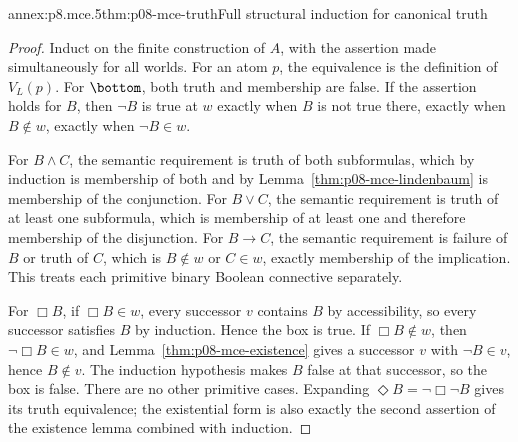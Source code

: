 \begin{annexitem}{annex:p8.mce.5}{thm:p08-mce-truth}{Full structural induction for canonical truth}
\begin{proof}
Induct on the finite construction of \(A\), with the assertion made
simultaneously for all worlds. For an atom \(p\), the equivalence is
the definition of \(V_L(p)\). For \(\bottom\), both truth and
membership are false. If the assertion holds for \(B\), then
\(\neg B\) is true at \(w\) exactly when \(B\) is not true
there, exactly when \(B\notin w\), exactly when \(\neg B\in w\).

For \(B\land C\), the semantic requirement is truth of both
subformulas, which by induction is membership of both and by
Lemma~\ref{thm:p08-mce-lindenbaum} is membership of the conjunction.
For \(B\lor C\), the semantic requirement is truth of at least one
subformula, which is membership of at least one and therefore membership
of the disjunction. For \(B\to C\), the semantic requirement is
failure of \(B\) or truth of \(C\), which is \(B\notin w\) or
\(C\in w\), exactly membership of the implication. This treats each
primitive binary Boolean connective separately.

For \(\Box B\), if \(\Box B\in w\), every successor \(v\)
contains \(B\) by accessibility, so every successor satisfies \(B\)
by induction. Hence the box is true. If \(\Box B\notin w\), then
\(\neg\Box B\in w\), and Lemma~\ref{thm:p08-mce-existence}
gives a successor \(v\) with \(\neg B\in v\), hence \(B\notin v\).
The induction hypothesis makes \(B\) false at that successor, so the
box is false. There are no other primitive cases. Expanding
\(\Diamond B=\neg\Box\neg B\) gives its truth equivalence; the
existential form is also exactly the second assertion of the existence
lemma combined with induction.
\end{proof}
\end{annexitem}

